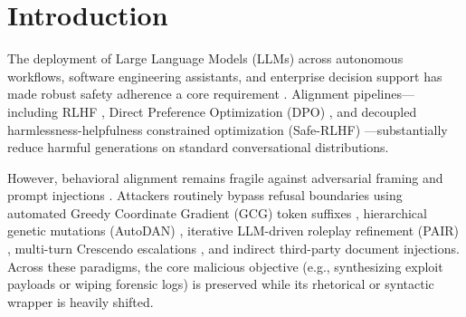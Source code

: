 \documentclass[11pt,twocolumn,a4paper]{article}
\begin{document}
\section{Introduction}
\label{sec:intro}

The deployment of Large Language Models (LLMs) across autonomous workflows, software engineering assistants, and enterprise decision support has made robust safety adherence a core requirement \citep{christiano2017deep,ouyang2022training,bai2022constitutional,ji2023beavertails}. Alignment pipelines---including RLHF \citep{ouyang2022training}, Direct Preference Optimization (DPO) \citep{rafailov2023direct}, and decoupled harmlessness-helpfulness constrained optimization (Safe-RLHF) \citep{dai2024safe,ji2024pkusaferlhf,ji2025saferlhfv}---substantially reduce harmful generations on standard conversational distributions.

However, behavioral alignment remains fragile against adversarial framing and prompt injections \citep{wei2024jailbroken,zou2023universal,mazeika2024harmbench}. Attackers routinely bypass refusal boundaries using automated Greedy Coordinate Gradient (GCG) token suffixes \citep{zou2023universal}, hierarchical genetic mutations (AutoDAN) \citep{liu2023autodan}, iterative LLM-driven roleplay refinement (PAIR) \citep{chao2023jailbreaking}, multi-turn Crescendo escalations \citep{russinovich2024crescendo}, and indirect third-party document injections. Across these paradigms, the core malicious objective (e.g., synthesizing exploit payloads or wiping forensic logs) is preserved while its rhetorical or syntactic wrapper is heavily shifted.
\end{document}
